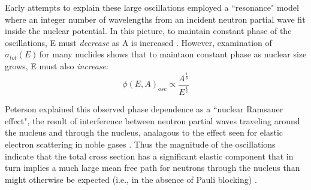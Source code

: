 \documentclass[twocolumn,secnumarabic,amssymb, nobibnotes, aps, prl,
superscriptaddress, nobalancelastpage]{revtex4}
\newcommand{\totEs}{\ensuremath{\sigma_{tot}(E)\,}}
\begin{document}

Early attempts to explain these large oscillations employed a ``resonance" model
where an integer number of wavelengths from an incident neutron partial wave fit
inside the nuclear potential. In this picture, to maintain constant phase of the
oscillations, E must \textit{decrease} as A is increased \cite{Satchler1980,
Peterson1962}. However, examination of \totEs for many nuclides shows that to
maintaon constant phase as nuclear size grows, E must also \textit{increase}:
\begin{equation}
    \phi (E,A)_{osc} \propto \frac{A^{\frac{1}{3}}}{E^{\frac{1}{2}}}
\end{equation}

Peterson explained this observed phase dependence as a ``nuclear Ramsauer
effect", the result of interference between neutron partial waves traveling
around the nucleus and through the nucleus, analagous to the effect seen for
elastic electron scattering in noble gases \cite{Fernbach1949, Peterson1962,
Lawson1953}. Thus the magnitude of the oscillations indicate that the total
cross section has a significant elastic component that in turn implies a much
large mean free path for neutrons through the nucleus than might otherwise be
expected (i.e., in the absence of Pauli blocking) \cite{Mohr1955}.
\end{document}
